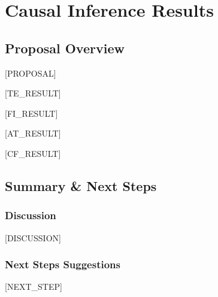 \section{Causal Inference Results}
\subsection{Proposal Overview}
[PROPOSAL]

[TE_RESULT]

[FI_RESULT]

[AT_RESULT]

[CF_RESULT]

\subsection{Summary \& Next Steps}
\subsubsection{Discussion}

[DISCUSSION]


\subsubsection{Next Steps Suggestions}

[NEXT_STEP]

